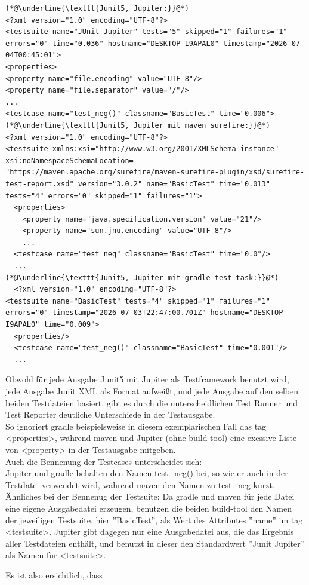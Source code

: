 \begin{lstlisting}[caption={direkter Vergleich von Junit XML, erzeugt durch Junit5 mit Jupiter in Java. Jeder Ausgabe liegen die selben beiden Testdateien zu Grunde.\\ \textellipsis{} bezeichnet gekürzte Stellen.}, label={JAVACompare}]
(*@\underline{\texttt{Junit5, Jupiter:}}@*)
<?xml version="1.0" encoding="UTF-8"?>
<testsuite name="JUnit Jupiter" tests="5" skipped="1" failures="1" errors="0" time="0.036" hostname="DESKTOP-I9APAL0" timestamp="2026-07-04T00:45:01">
<properties>
<property name="file.encoding" value="UTF-8"/>
<property name="file.separator" value="/"/>
...
<testcase name="test_neg()" classname="BasicTest" time="0.006">
(*@\underline{\texttt{Junit5, Jupiter mit maven surefire:}}@*)
<?xml version="1.0" encoding="UTF-8"?>
<testsuite xmlns:xsi="http://www.w3.org/2001/XMLSchema-instance" xsi:noNamespaceSchemaLocation=
"https://maven.apache.org/surefire/maven-surefire-plugin/xsd/surefire-test-report.xsd" version="3.0.2" name="BasicTest" time="0.013" tests="4" errors="0" skipped="1" failures="1">
  <properties>
    <property name="java.specification.version" value="21"/>
    <property name="sun.jnu.encoding" value="UTF-8"/>
    ...
  <testcase name="test_neg" classname="BasicTest" time="0.0"/>
  ...
(*@\underline{\texttt{Junit5, Jupiter mit gradle test task:}}@*)
  <?xml version="1.0" encoding="UTF-8"?>
<testsuite name="BasicTest" tests="4" skipped="1" failures="1" errors="0" timestamp="2026-07-03T22:47:00.701Z" hostname="DESKTOP-I9APAL0" time="0.009">
  <properties/>
  <testcase name="test_neg()" classname="BasicTest" time="0.001"/>
  ...
\end{lstlisting}
Obwohl für jede Ausgabe Junit5 mit Jupiter als Testframework benutzt wird, jede Ausgabe Junit XML als Format aufweißt, und jede Ausgabe auf den selben beiden Testdateien basiert, gibt es durch die unterscheidlichen Test Runner und Test Reporter deutliche Unterschiede in der Testausgabe.\\
So ignoriert gradle beispielsweise in diesem exemplarischen Fall das tag <properties>, während maven und Jupiter (ohne build-tool) eine exessive Liste von <property> in der Testausgabe mitgeben. \\
Auch die Bennenung der Testcases unterscheidet sich:\\
Jupiter und gradle behalten den Namen test\_neg() bei, so wie er auch in der Testdatei verwendet wird, während maven den Namen zu test\_neg kürzt.\\
Ähnliches bei der Bennenug der Testsuite: Da gradle und maven für jede Datei eine eigene Ausgabedatei erzeugen, benutzen die beiden build-tool den Namen der jeweiligen Testsuite, hier ''BasicTest'', als Wert des Attributes ''name'' im tag <testsuite>. Jupiter gibt dagegen nur eine Ausgabedatei aus, die das Ergebnis aller Testdateien enthält, und benutzt in dieser den Standardwert ''Junit Jupiter'' als Namen für <testsuite>.

Es ist also ersichtlich, dass
